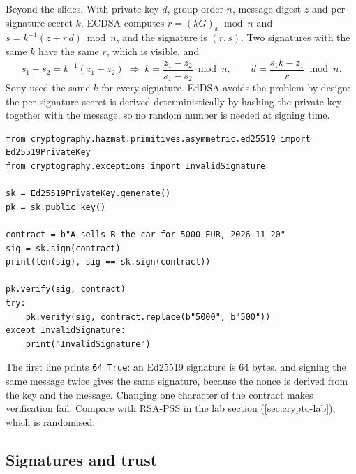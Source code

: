 \begin{remark}
Beyond the slides. With private key $d$, group order $n$, message digest $z$ and per-signature secret $k$, ECDSA computes $r = (kG)_x \bmod n$ and $s = k^{-1}(z + r\,d) \bmod n$, and the signature is $(r, s)$. Two signatures with the same $k$ have the same $r$, which is visible, and
\[
    s_1 - s_2 = k^{-1}(z_1 - z_2) \;\Rightarrow\; k = \frac{z_1 - z_2}{s_1 - s_2} \bmod n, \qquad d = \frac{s_1 k - z_1}{r} \bmod n.
\]
Sony used the same $k$ for every signature. EdDSA avoids the problem by design: the per-signature secret is derived deterministically by hashing the private key together with the message, so no random number is needed at signing time.
\end{remark}

\begin{verbatim}
from cryptography.hazmat.primitives.asymmetric.ed25519 import Ed25519PrivateKey
from cryptography.exceptions import InvalidSignature

sk = Ed25519PrivateKey.generate()
pk = sk.public_key()

contract = b"A sells B the car for 5000 EUR, 2026-11-20"
sig = sk.sign(contract)
print(len(sig), sig == sk.sign(contract))

pk.verify(sig, contract)
try:
    pk.verify(sig, contract.replace(b"5000", b"500"))
except InvalidSignature:
    print("InvalidSignature")
\end{verbatim}

The first line prints \texttt{64 True}: an Ed25519 signature is 64 bytes, and signing the same message twice gives the same signature, because the nonce is derived from the key and the message. Changing one character of the contract makes verification fail. Compare with RSA-PSS in the lab section (\cref{sec:crypto-lab}), which is randomised.

\subsection{Signatures and trust}

